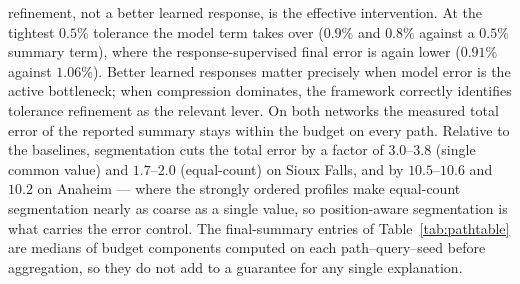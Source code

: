 refinement, not a better learned response, is the effective
intervention. At the tightest $0.5\%$ tolerance the model term takes
over ($0.9\%$ and $0.8\%$ against a $0.5\%$ summary term), where the
response-supervised final error is again lower ($0.91\%$ against
$1.06\%$). Better learned responses matter precisely when model error
is the active bottleneck; when compression dominates, the framework
correctly identifies tolerance refinement as the relevant lever. On
both networks the measured total error of the reported summary stays
within the budget on every path. Relative to the baselines,
segmentation cuts the total error by a factor of $3.0$--$3.8$ (single
common value) and $1.7$--$2.0$ (equal-count) on Sioux Falls, and by
$10.5$--$10.6$ and $10.2$ on Anaheim --- where the strongly ordered
profiles make equal-count segmentation nearly as coarse as a single
value, so position-aware segmentation is what carries the error
control. The final-summary entries of Table~\ref{tab:pathtable} are
medians of budget components computed on each path--query--seed before
aggregation, so they do not add to a guarantee for any single
explanation.

